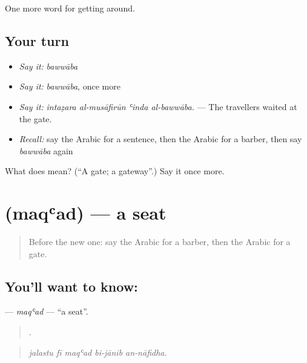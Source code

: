 \begin{grammarlens}[title={What you've built}]
One more word for getting around.
\end{grammarlens}

\subsection*{Your turn}
\begin{itemize}
\raggedright
  \item \emph{Say it:} \emph{bawwāba}
  \item \emph{Say it:} \emph{bawwāba}, once more
  \item \emph{Say it:} \emph{intaẓara al-musāfirūn ʿinda al-bawwāba.} — The travellers waited at the gate.
  \item \emph{Recall:} say the Arabic for a sentence, then the Arabic for a barber, then say \emph{bawwāba} again
\end{itemize}

\begin{tcolorbox}[breakable,colback=teal!4,colframe=teal!35!black,title={Before you move on}]
What does  mean? (\textquotedblleft{}A gate; a gateway\textquotedblright{}.) Say it once more.
\end{tcolorbox}
\section[\texorpdfstring{\ar{مقعد} (maqʿad)}{مقعد (maqʿad)}]{ (maqʿad) — a seat}

\label{lesson:AR-C423-maqad}



\begin{quote}
Before the new one: say the Arabic for a barber, then the Arabic for a gate.
\end{quote}

\subsection*{You'll want to know: }
\textbf{} — \emph{maqʿad} — \textquotedblleft{}a seat\textquotedblright{}.

\begin{quote}
    .
\end{quote}

\begin{quote}
\emph{jalastu fī maqʿad bi-jānib an-nāfidha.}
\end{quote}

